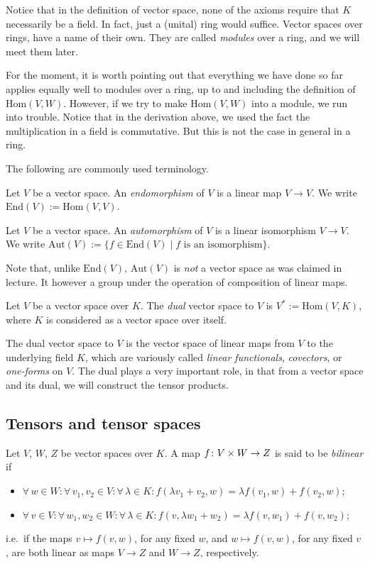 \br
Notice that in the definition of vector space, none of the axioms require that $K$ necessarily be a field. In fact, just a (unital) ring would suffice. Vector spaces over rings, have a name of their own. They are called \emph{modules} over a ring, and we will meet them later.

For the moment, it is worth pointing out that everything we have done so far applies equally well to modules over a ring, up to and including the definition of $\mathrm{Hom}(V,W)$. However, if we try to make $\mathrm{Hom}(V,W)$ into a module, we run into trouble. Notice that in the derivation above, we used the fact the multiplication in a field is commutative. But this is not the case in general in a ring.
\er

The following are commonly used terminology.

\bd
Let $V$ be a vector space. An \emph{endomorphism} of $V$ is a linear map $V\to V$. We write $\mathrm{End}(V):=\mathrm{Hom}(V,V)$.
\ed

\bd
Let $V$ be a vector space. An \emph{automorphism} of $V$ is a linear isomorphism $V\to V$. We write $\mathrm{Aut}(V):=\{f \in \mathrm{End}(V) \mid f \text{ is an isomorphism}\}$.
\ed

\br
Note that, unlike $\mathrm{End}(V)$, $\mathrm{Aut}(V)$ is \emph{not} a vector space as was claimed in lecture. It however a group under the operation of composition of linear maps.
\er

\bd
Let $V$ be a vector space over $K$. The \emph{dual} vector space to $V$ is $V^*:=\mathrm{Hom}(V,K)$, where $K$ is considered as a vector space over itself.
\ed

The dual vector space to $V$ is the vector space of linear maps from $V$ to the underlying field $K$, which are variously called \emph{linear functionals}, \emph{covectors}, or \emph{one-forms} on $V$. The dual plays a very important role, in that from a vector space and its dual, we will construct the tensor products.

\subsection{Tensors and tensor spaces}

\bd
Let $V$, $W$, $Z$ be vector spaces over $K$. A map $f\colon V\times W \to Z$ is said to be \emph{bilinear} if
\begin{itemize}
\item $\forall \, w\in W:\forall \, v_1,v_2\in V: \forall \,\lambda \in K : f(\lambda v_1+v_2,w)=\lambda f(v_1,w)+f(v_2,w)$;
\item $\forall \, v\in V:\forall \, w_1,w_2\in W: \forall \,\lambda \in K : f(v,\lambda w_1+w_2)=\lambda f(v,w_1)+f(v,w_2)$;
\end{itemize}
i.e.\ if the maps $v\mapsto f(v,w)$, for any fixed $w$, and $w\mapsto f(v,w)$, for any fixed $v$, are both linear as maps $V\to Z$ and $W\to Z$, respectively.
\ed

